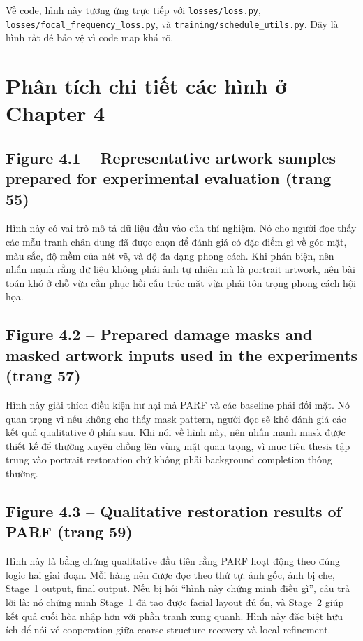 \documentclass[12pt,a4paper]{article}
\begin{document}
Về code, hình này tương ứng trực tiếp với \texttt{losses/loss.py}, \texttt{losses/focal\_frequency\_loss.py}, và \texttt{training/schedule\_utils.py}. Đây là hình rất dễ bảo vệ vì code map khá rõ.

\section{Phân tích chi tiết các hình ở Chapter 4}

\subsection*{Figure 4.1 -- Representative artwork samples prepared for experimental evaluation (trang 55)}
Hình này có vai trò mô tả dữ liệu đầu vào của thí nghiệm. Nó cho người đọc thấy các mẫu tranh chân dung đã được chọn để đánh giá có đặc điểm gì về góc mặt, màu sắc, độ mềm của nét vẽ, và độ đa dạng phong cách. Khi phản biện, nên nhấn mạnh rằng dữ liệu không phải ảnh tự nhiên mà là portrait artwork, nên bài toán khó ở chỗ vừa cần phục hồi cấu trúc mặt vừa phải tôn trọng phong cách hội họa.

\subsection*{Figure 4.2 -- Prepared damage masks and masked artwork inputs used in the experiments (trang 57)}
Hình này giải thích điều kiện hư hại mà PARF và các baseline phải đối mặt. Nó quan trọng vì nếu không cho thấy mask pattern, người đọc sẽ khó đánh giá các kết quả qualitative ở phía sau. Khi nói về hình này, nên nhấn mạnh mask được thiết kế để thường xuyên chồng lên vùng mặt quan trọng, vì mục tiêu thesis tập trung vào portrait restoration chứ không phải background completion thông thường.

\subsection*{Figure 4.3 -- Qualitative restoration results of PARF (trang 59)}
Hình này là bằng chứng qualitative đầu tiên rằng PARF hoạt động theo đúng logic hai giai đoạn. Mỗi hàng nên được đọc theo thứ tự: ảnh gốc, ảnh bị che, Stage~1 output, final output. Nếu bị hỏi ``hình này chứng minh điều gì'', câu trả lời là: nó chứng minh Stage~1 đã tạo được facial layout đủ ổn, và Stage~2 giúp kết quả cuối hòa nhập hơn với phần tranh xung quanh. Hình này đặc biệt hữu ích để nói về cooperation giữa coarse structure recovery và local refinement.
\end{document}
